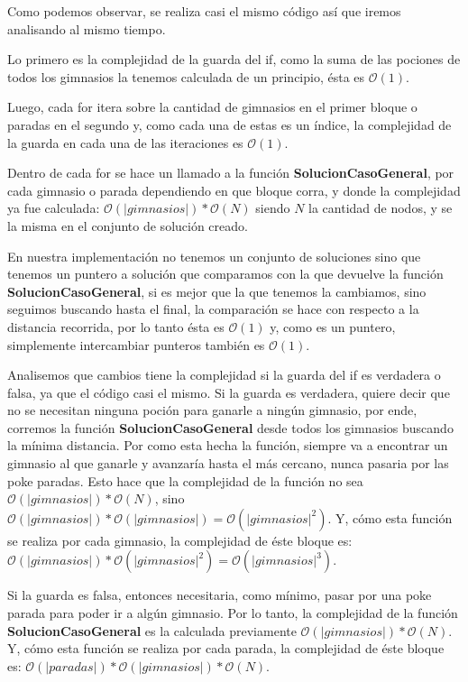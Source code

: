 Como podemos observar, se realiza casi el mismo código así que iremos analisando al mismo tiempo.

Lo primero es la complejidad de la guarda del if, como la suma de las pociones de todos los gimnasios la tenemos calculada de un principio, ésta es $\mathcal{O}(1)$.

Luego, cada for itera sobre la cantidad de gimnasios en el primer bloque o paradas en el segundo y, como cada una de estas es un índice, la complejidad de la guarda en cada una de las iteraciones es $\mathcal{O}(1)$.

Dentro de cada for se hace un llamado a la función \textbf{SolucionCasoGeneral}, por cada gimnasio o parada dependiendo en que bloque corra, y donde la complejidad ya fue calculada: $\mathcal{O}(|gimnasios|) * \mathcal{O}(N)$ siendo $N$ la cantidad de nodos, y se la misma en el conjunto de solución creado.

En nuestra implementación no tenemos un conjunto de soluciones sino que tenemos un puntero a solución que comparamos con la que devuelve la función \textbf{SolucionCasoGeneral}, si es mejor que la que tenemos la cambiamos, sino seguimos buscando hasta el final, la comparación se hace con respecto a la distancia recorrida, por lo tanto ésta es $\mathcal{O}(1)$ y, como es un puntero, simplemente intercambiar punteros también es $\mathcal{O}(1)$.

Analisemos que cambios tiene la complejidad si la guarda del if es verdadera o falsa, ya que el código casi el mismo. Si la guarda es verdadera, quiere decir que no se necesitan ninguna poción para ganarle a ningún gimnasio, por ende, corremos la función \textbf{SolucionCasoGeneral} desde todos los gimnasios buscando la mínima distancia. Por como esta hecha la función, siempre va a encontrar un gimnasio al que ganarle y avanzaría hasta el más cercano, nunca pasaria por las poke paradas. Esto hace que la complejidad de la función no sea $\mathcal{O}(|gimnasios|) * \mathcal{O}(N)$, sino $\mathcal{O}(|gimnasios|) * \mathcal{O}(|gimnasios|) = \mathcal{O}(|gimnasios|^2)$. Y, cómo esta función se realiza por cada gimnasio, la complejidad de éste bloque es: $\mathcal{O}(|gimnasios|)* \mathcal{O}(|gimnasios|^2) = \mathcal{O}(|gimnasios|^3)$.

Si la guarda es falsa, entonces necesitaria, como mínimo, pasar por una poke parada para poder ir a algún gimnasio. Por lo tanto, la complejidad de la función \textbf{SolucionCasoGeneral} es la calculada previamente $\mathcal{O}(|gimnasios|) * \mathcal{O}(N)$. Y, cómo esta función se realiza por cada parada, la complejidad de éste bloque es: $\mathcal{O}(|paradas|) * \mathcal{O}(|gimnasios|) * \mathcal{O}(N)$.

